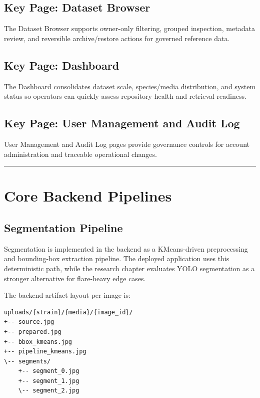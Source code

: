 \subsection{Key Page: Dataset Browser}\label{key-page-dataset-browser-data-owner}

The Dataset Browser supports owner-only filtering, grouped inspection, metadata review, and reversible archive/restore actions for governed reference data.

\subsection{Key Page: Dashboard}\label{key-page-dashboard-data-owner}

The Dashboard consolidates dataset scale, species/media distribution, and system status so operators can quickly assess repository health and retrieval readiness.

\subsection{Key Page: User Management and Audit Log}\label{key-page-user-management-audit-log-data-owner}

User Management and Audit Log pages provide governance controls for account administration and traceable operational changes.
\begin{center}\rule{0.5\linewidth}{0.5pt}\end{center}

\section{Core Backend Pipelines}\label{core-backend-pipelines}

\subsection{Segmentation Pipeline}\label{segmentation-pipeline}

Segmentation is implemented in the backend as a KMeans-driven preprocessing and bounding-box extraction pipeline. The deployed application uses this deterministic path, while the research chapter evaluates YOLO segmentation as a stronger alternative for flare-heavy edge cases.

The backend artifact layout per image is:

\begin{verbatim}
uploads/{strain}/{media}/{image_id}/
+-- source.jpg
+-- prepared.jpg
+-- bbox_kmeans.jpg
+-- pipeline_kmeans.jpg
\-- segments/
    +-- segment_0.jpg
    +-- segment_1.jpg
    \-- segment_2.jpg
\end{verbatim}


